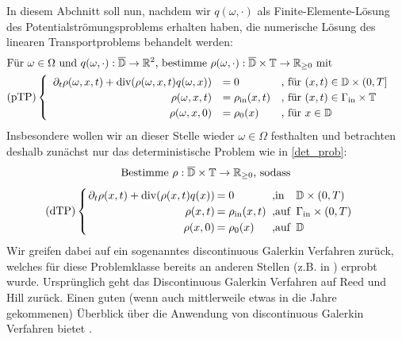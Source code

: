 \label{DG}
In diesem Abchnitt soll nun, nachdem wir $q(\omega,\cdot)$ als Finite-Elemente-Lösung des Potentialströmungsproblems erhalten haben, die numerische Lösung des linearen Transportproblems behandelt werden:
\begin{align*}
	&\text{Für } \omega \in \Omega \text{ und }q(\omega,\cdot): \overline{\mathbb{D}} \to \mathbb{R}^2 \text{, bestimme }\rho(\omega,\cdot): \overline{\mathbb{D}} \times \mathbb{T} \to \mathbb{R}_{\geq 0} \text{ mit} \\
	&\text{(pTP)} 
	\begin{cases}
	\begin{array}{rlll}
	\partial_t \rho (\omega, x, t) + \operatorname{div}(\rho(\omega,x,t)q(\omega,x)) &= 0 &\text{, für } (x,t) \in \mathbb{D} \times (0,T] \\
	\rho(\omega,x,t) &= \rho_{\text{in}}(x,t) &\text{, für } (x,t) \in \Gamma_{\text{in}} \times \mathbb{T} \\
	\rho(\omega,x,0)  &= \rho_0(x) &\text{, für } x \in  \mathbb{D}
	\end{array}
	\end{cases} \\
\end{align*}
Insbesondere wollen wir an dieser Stelle wieder $\omega \in \Omega$ festhalten und betrachten deshalb zunächst nur das deterministische Problem wie in \ref{det_prob}:
\[ 
\text{Bestimme } \rho: \overline{\mathbb{D}} \times \mathbb{T} \to \R_{\geq 0} \text{, sodass} \newline \]
\[\setlength\arraycolsep{1pt}
\text{(dTP)}\begin{cases} 
\begin{array}{rlll}
\partial_t \rho(x,t) + \dive(\rho(x,t) q(x)) &= 0 &\text{ ,in } &\mathbb{D} \times (0,T)\\
\rho(x,t) &= \rho_{\text{in}}(x,t) &\text{ ,auf } &\Gamma_{\text{in}} \times (0,T)\\
\rho(x,0) &= \rho_0(x) &\text{ ,auf } &\mathbb{D} \\
\end{array}
\end{cases} \\
\]
 Wir greifen dabei auf ein sogenanntes discontinuous Galerkin Verfahren zurück, welches für diese Problemklasse bereits an anderen Stellen (z.B. in \cite{cockburn1998runge}) erprobt wurde. Ursprünglich geht das Discontinuous Galerkin Verfahren auf Reed und Hill \cite{reed1973triangular} zurück. Einen guten (wenn auch mittlerweile etwas in die Jahre gekommenen) Überblick über die Anwendung von discontinuous Galerkin Verfahren bietet \cite{cockburn2000development}.

